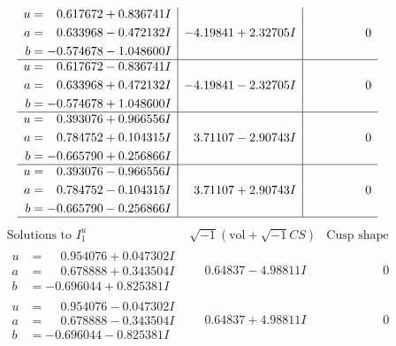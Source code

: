 \documentclass[1p]{elsarticle_modified}
\theoremstyle{definition}
\newcommand{\I}{\sqrt{-1}}
\begin{document}
$$\begin{array}{c|c|c}
\begin{aligned}
u &= \phantom{-}0.617672 + 0.836741 I \\
a &= \phantom{-}0.633968 - 0.472132 I \\
b &= -0.574678 - 1.048600 I\end{aligned}
 & -4.19841 + 2.32705 I & \phantom{-0.000000 } 0 \\ \hline\begin{aligned}
u &= \phantom{-}0.617672 - 0.836741 I \\
a &= \phantom{-}0.633968 + 0.472132 I \\
b &= -0.574678 + 1.048600 I\end{aligned}
 & -4.19841 - 2.32705 I & \phantom{-0.000000 } 0 \\ \hline\begin{aligned}
u &= \phantom{-}0.393076 + 0.966556 I \\
a &= \phantom{-}0.784752 + 0.104315 I \\
b &= -0.665790 + 0.256866 I\end{aligned}
 & \phantom{-}3.71107 - 2.90743 I & \phantom{-0.000000 } 0 \\ \hline\begin{aligned}
u &= \phantom{-}0.393076 - 0.966556 I \\
a &= \phantom{-}0.784752 - 0.104315 I \\
b &= -0.665790 - 0.256866 I\end{aligned}
 & \phantom{-}3.71107 + 2.90743 I & \phantom{-0.000000 } 0\\
 \hline 
 \end{array}$$\newpage$$\begin{array}{c|c|c}  
\text{Solutions to }I^u_{1}& \I (\text{vol} + \sqrt{-1}CS) & \text{Cusp shape}\\
 \hline 
\begin{aligned}
u &= \phantom{-}0.954076 + 0.047302 I \\
a &= \phantom{-}0.678888 + 0.343504 I \\
b &= -0.696044 + 0.825381 I\end{aligned}
 & \phantom{-}0.64837 - 4.98811 I & \phantom{-0.000000 } 0 \\ \hline\begin{aligned}
u &= \phantom{-}0.954076 - 0.047302 I \\
a &= \phantom{-}0.678888 - 0.343504 I \\
b &= -0.696044 - 0.825381 I\end{aligned}
 & \phantom{-}0.64837 + 4.98811 I & \phantom{-0.000000 } 0 \\ \hline\begin{aligned}

\end{aligned}
\end{array}$$
\end{document}
